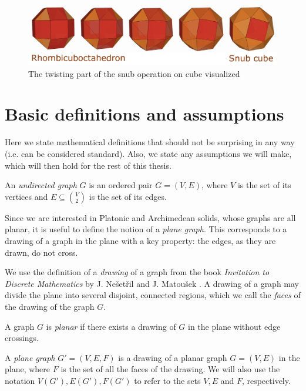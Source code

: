 \begin{description}
\begin{figure}[H]
    \centering
    \includegraphics[width=1\textwidth]{Resources/Figs/op_snub_pdfa.pdf}
    \caption{The twisting part of the snub operation on cube visualized \cite{natal-polyhed-viewer}}
    \label{fig:op_snub}
\end{figure}
    
\end{description}

\section{Basic definitions and assumptions}

Here we state mathematical definitions that should not be surprising in any way (i.e. can be considered standard). Also, we state any assumptions we will make, which will then hold for the rest of this thesis.

\begin{defn}
    An \emph{undirected graph} $G$ is an ordered pair $G = (V,E)$, where $V$ is the set of its vertices and $E \subseteq \binom{V}{2}$ is the set of its edges. 
\end{defn}

Since we are interested in Platonic and Archimedean solids, whose graphs are all planar, it is useful to define the notion of a \textit{plane graph}. This corresponds to a drawing of a graph in the plane with a key property: the edges, as they are drawn, do not cross.

We use the definition of a \textit{drawing} of a graph from the book \textit{Invitation to Discrete Mathematics} by J. Nešetřil and J. Matoušek \cite{matousek2009}. A drawing of a graph may divide the plane into several disjoint, connected regions, which we call the \textit{faces} of the drawing of the graph $G$.

\begin{defn}
    A graph $G$ is \emph{planar} if there exists a drawing of $G$ in the plane without edge crossings.
\end{defn}

\begin{defn}
    A \emph{plane graph} $G' = (V, E, F)$ is a drawing of a planar graph $G = (V, E)$ in the plane, where $F$ is the set of all the faces of the drawing. We will also use the notation $V(G'), E(G'), F(G')$ to refer to the sets $V, E$ and $F$, respectively.
\end{defn}

